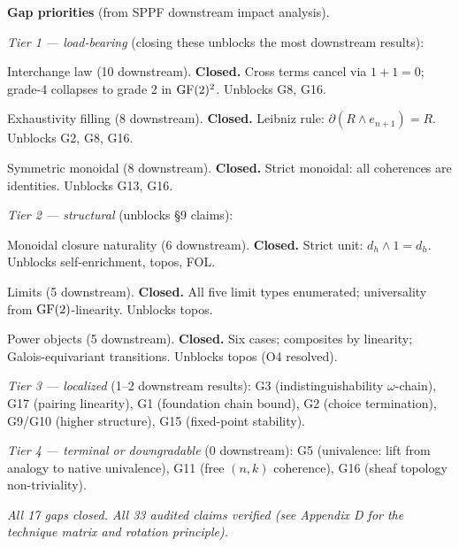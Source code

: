 \medskip
\noindent\textbf{Gap priorities} (from SPPF downstream
impact analysis).

\emph{Tier 1 --- load-bearing} (closing these unblocks the
most downstream results):
\begin{description}[nosep,leftmargin=0.8cm]
  \item[G6] Interchange law (10 downstream).
    \textbf{Closed.} Cross terms cancel via $1+1=0$;
    grade-4 collapses to grade 2 in $\operatorname{GF}(2)^2$.
    Unblocks G8, G16.
  \item[G4] Exhaustivity filling (8 downstream).
    \textbf{Closed.} Leibniz rule: $\partial(R \wedge
    e_{n+1}) = R$. Unblocks G2, G8, G16.
  \item[G12] Symmetric monoidal (8 downstream).
    \textbf{Closed.} Strict monoidal: all coherences
    are identities. Unblocks G13, G16.
\end{description}

\emph{Tier 2 --- structural} (unblocks \S9 claims):
\begin{description}[nosep,leftmargin=0.8cm]
  \item[G13] Monoidal closure naturality (6 downstream).
    \textbf{Closed.} Strict unit: $d_h \wedge 1 = d_h$.
    Unblocks self-enrichment, topos, FOL.
  \item[G8] Limits (5 downstream). \textbf{Closed.}
    All five limit types enumerated; universality from
    $\operatorname{GF}(2)$-linearity. Unblocks topos.
  \item[G14] Power objects (5 downstream).
    \textbf{Closed.} Six cases; composites by linearity;
    Galois-equivariant transitions. Unblocks topos
    (O4 resolved).
\end{description}

\emph{Tier 3 --- localized} (1--2 downstream results):
G3 (indistinguishability $\omega$-chain), G17 (pairing
linearity), G1 (foundation chain bound), G2 (choice
termination), G9/G10 (higher structure), G15 (fixed-point
stability).

\emph{Tier 4 --- terminal or downgradable} (0 downstream):
G5 (univalence: lift from analogy to native
univalence), G11 (free $(n,k)$ coherence),
G16 (sheaf topology non-triviality).

\emph{All 17 gaps closed. All 33 audited claims verified
(see Appendix D for the technique matrix and rotation principle).}

